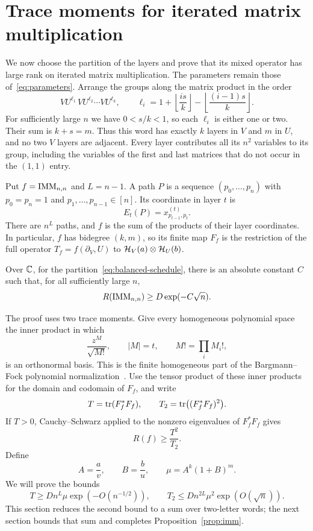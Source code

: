 \section{Trace moments for iterated matrix multiplication}
\label{sec:moments}

We now choose the partition of the layers and prove that its mixed operator
has large rank on iterated matrix multiplication.  The parameters remain
those of~\eqref{eq:parameters}.  Arrange the groups along the matrix product
in the order
\begin{equation}
  VU^{\ell_1}\,VU^{\ell_2}\cdots VU^{\ell_k},
  \qquad
  \ell_i=1+\left\lfloor\frac{is}{k}\right\rfloor
             -\left\lfloor\frac{(i-1)s}{k}\right\rfloor.
  \label{eq:balanced-schedule}
\end{equation}
For sufficiently large $n$ we have $0<s/k<1$, so each $\ell_i$ is either
one or two.  Their sum is $k+s=m$.  Thus this word has exactly $k$ layers
in $V$ and $m$ in $U$, and no two $V$ layers are adjacent.  Every layer
contributes all its $n^2$ variables to its group, including the variables
of the first and last matrices that do not occur in the $(1,1)$ entry.

Put $f=\operatorname{IMM}_{n,n}$ and $L=n-1$.  A path $P$ is a sequence
$(p_0,\ldots,p_n)$ with $p_0=p_n=1$ and $p_1,\ldots,p_{n-1}\in[n]$.
Its coordinate in layer $t$ is
\[
  E_t(P)=x^{(t)}_{p_{t-1},p_t}.
\]
There are $n^L$ paths, and $f$ is the sum of the products of their layer
coordinates.  In particular, $f$ has bidegree $(k,m)$, so its finite map
$F_f$ is the restriction of the full operator $T_f=f(\partial_V,U)$ to
$\mathcal H_V(a)\otimes\mathcal H_U(b)$.

\begin{proposition}
\label{prop:imm}
Over $\mathbb C$, for the partition~\eqref{eq:balanced-schedule}, there is an
absolute constant $C$ such that, for all sufficiently large $n$,
\[
  R(\operatorname{IMM}_{n,n})\ge D\exp(-C\sqrt n).
\]
\end{proposition}

The proof uses two trace moments.  Give every homogeneous polynomial
space the inner product in which
\[
  \frac{z^M}{\sqrt{M!}},\qquad |M|=t,
  \qquad M!=\prod_i M_i!,
\]
is an orthonormal basis.  This is the finite homogeneous part of the
Bargmann--Fock polynomial normalization~\cite{Bargmann1962}.
Use the tensor product of these inner products
for the domain and codomain of $F_f$, and write
\[
  T=\operatorname{tr}(F_f^*F_f),\qquad
  T_2=\operatorname{tr}\bigl((F_f^*F_f)^2\bigr).
\]
If $T>0$, Cauchy--Schwarz applied to the nonzero eigenvalues of
$F_f^*F_f$ gives
\begin{equation}
  R(f)\ge \frac{T^2}{T_2}.
  \label{eq:trace-rank}
\end{equation}
Define
\[
  A=\frac av,\qquad B=\frac bu,\qquad
  \mu=A^k(1+B)^m.
\]
We will prove the bounds
\[
 T\ge Dn^L\mu\exp(-O(n^{-1/2})),\qquad
 T_2\le Dn^{2L}\mu^2\exp(O(\sqrt n)).
\]
This section reduces
the second bound to a sum over two-letter words; the next section bounds
that sum and completes Proposition~\ref{prop:imm}.

